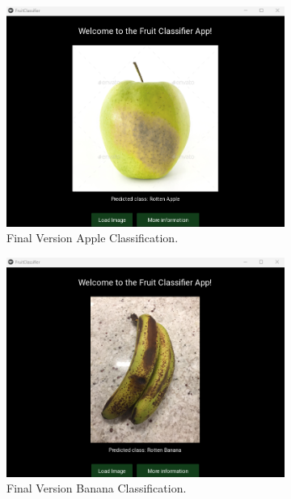 \documentclass[conference]{IEEEtran}
\begin{document}
\begin{figure}[h]
    \hfill
    \begin{subfigure}[b]{0.48\linewidth}
        \centering
        \includegraphics[width=\linewidth]{Mlayer appelR3.png}
        \caption{Final Version Apple Classification.}
        \label{figFB}
    \end{subfigure}
    \hfill
    \begin{subfigure}[b]{0.48\linewidth}
        \centering
        \includegraphics[width=\linewidth]{Mlayer bananaR1.png}
        \caption{Final Version Banana Classification.}
        \label{figFA}
    \end{subfigure}
    \hfill
    \begin{subfigure}[b]{0.48\linewidth}

\end{subfigure}
\end{figure}
\end{document}
